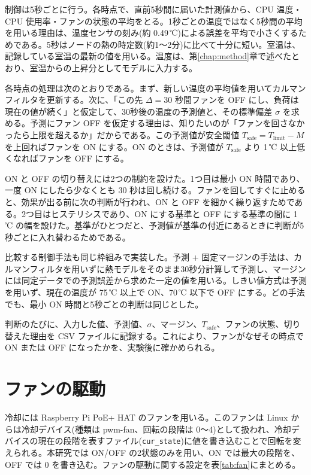 制御は5秒ごとに行う。各時点で、直前5秒間に届いた計測値から、CPU 温度・CPU 使用率・ファンの状態の平均をとる。1秒ごとの温度ではなく5秒間の平均を用いる理由は、温度センサの刻み(約 0.49\,℃)による誤差を平均で小さくするためである。5秒はノードの熱の時定数(約1〜2分)に比べて十分に短い。室温は、記録している室温の最新の値を用いる。温度は、第\ref{chap:method}章で述べたとおり、室温からの上昇分としてモデルに入力する。

各時点の処理は次のとおりである。まず、新しい温度の平均値を用いてカルマンフィルタを更新する。次に、「この先 $\Delta=30$ 秒間ファンを OFF にし、負荷は現在の値が続く」と仮定して、30秒後の温度の予測値と、その標準偏差 $\sigma$ を求める。予測にファン OFF を仮定する理由は、知りたいのが「ファンを回さなかったら上限を超えるか」だからである。この予測値が安全閾値 $T_{\mathrm{safe}} = T_{\mathrm{limit}} - M$ を上回ればファンを ON にする。ON のときは、予測値が $T_{\mathrm{safe}}$ より 1\,℃ 以上低くなればファンを OFF にする。

ON と OFF の切り替えには2つの制約を設けた。1つ目は最小 ON 時間であり、一度 ON にしたら少なくとも 30 秒は回し続ける。ファンを回してすぐに止めると、効果が出る前に次の判断が行われ、ON と OFF を細かく繰り返すためである。2つ目はヒステリシスであり、ON にする基準と OFF にする基準の間に 1\,℃ の幅を設けた。基準がひとつだと、予測値が基準の付近にあるときに判断が5秒ごとに入れ替わるためである。

比較する制御手法も同じ枠組みで実装した。予測 + 固定マージンの手法は、カルマンフィルタを用いずに熱モデルをそのまま30秒分計算して予測し、マージンには同定データでの予測誤差から求めた一定の値を用いる。しきい値方式は予測を用いず、現在の温度が 75\,℃ 以上で ON、70\,℃ 以下で OFF にする。どの手法でも、最小 ON 時間と5秒ごとの判断は同じとした。

判断のたびに、入力した値、予測値、$\sigma$、マージン、$T_{\mathrm{safe}}$、ファンの状態、切り替えた理由を CSV ファイルに記録する。これにより、ファンがなぜその時点で ON または OFF になったかを、実験後に確かめられる。

\section{ファンの駆動}\label{sec:impl-fan}
冷却には Raspberry Pi PoE+ HAT のファンを用いる。このファンは Linux からは冷却デバイス(種類は pwm-fan、回転の段階は 0〜4)として扱われ、冷却デバイスの現在の段階を表すファイル(\texttt{cur\_state})に値を書き込むことで回転を変えられる。本研究では ON/OFF の2状態のみを用い、ON では最大の段階を、OFF では 0 を書き込む。ファンの駆動に関する設定を表\ref{tab:fan}にまとめる。

